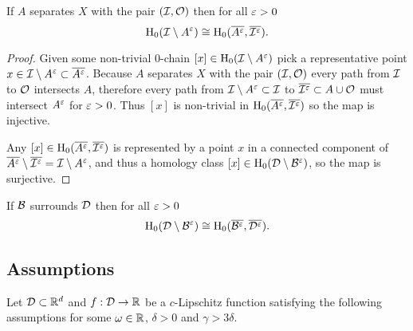 \begin{lemma}\label{lem:surrounds}
    If $A$ separates $X$ with the pair $({\mathcal{I}}, \mathcal{O})$ then for all $\varepsilon > 0$
    \[\mathrm{H}_0({\mathcal{I}}\setminus A^\varepsilon)\cong \mathrm{H}_0(\overline{A^\varepsilon}, \overline{{\mathcal{I}}^\varepsilon}).\]
\end{lemma}
\begin{proof}
    Given some non-trivial $0$-chain $[x]\in\mathrm{H}_0({\mathcal{I}}\setminus A^\varepsilon)$ pick a representative point $x\in {\mathcal{I}}\setminus A^\varepsilon \subset \overline{A^\varepsilon}$.
    Because $A$ separates $X$ with the pair $({\mathcal{I}}, \mathcal{O})$ every path from ${\mathcal{I}}$ to $\mathcal{O}$ intersects $A$, therefore every path from ${\mathcal{I}}\setminus A^\varepsilon\subset{\mathcal{I}}$ to $\overline{{\mathcal{I}}^\varepsilon} \subset A\cup \mathcal{O}$ must intersect $A^\varepsilon$ for $\varepsilon > 0$.
    Thus $[x]$ is non-trivial in $\mathrm{H}_0(\overline{A^\varepsilon}, \overline{{\mathcal{I}}^\varepsilon})$ so the map is injective.

    Any $[x]\in\mathrm{H}_0(\overline{A^\varepsilon}, \overline{{\mathcal{I}}^\varepsilon})$ is represented by a point $x$ in a connected component of $\overline{A^\varepsilon}\setminus \overline{{\mathcal{I}}^\varepsilon} = {\mathcal{I}}\setminus A^\varepsilon$, and thus a homology class $[x]\in\mathrm{H}_0({\mathcal{D}}\setminus{\mathcal{B}}^\varepsilon)$, so the map is surjective.
\end{proof}

\begin{corollary}\label{lem:surrounds}
    If ${\mathcal{B}}$ surrounds ${\mathcal{D}}$ then for all $\varepsilon > 0$
    \[\mathrm{H}_0({\mathcal{D}}\setminus{\mathcal{B}}^\varepsilon)\cong\mathrm{H}_0(\overline{{\mathcal{B}}^\varepsilon}, \overline{{\mathcal{D}}^\varepsilon}).\]
\end{corollary}

\subsection{Assumptions}\label{ssec:assumptions}

Let ${\mathcal{D}}\subset\mathbb{R}^d$ and $f:{\mathcal{D}}\to\mathbb{R}$ be a $c$-Lipschitz function satisfying the following assumptions for some $\omega\in\mathbb{R}$, $\delta > 0$ and $\gamma > 3\delta$.

\vspace{2ex}
\begin{center}
\setlength{\fboxsep}{2ex}
\end{center}\vspace{4ex}

